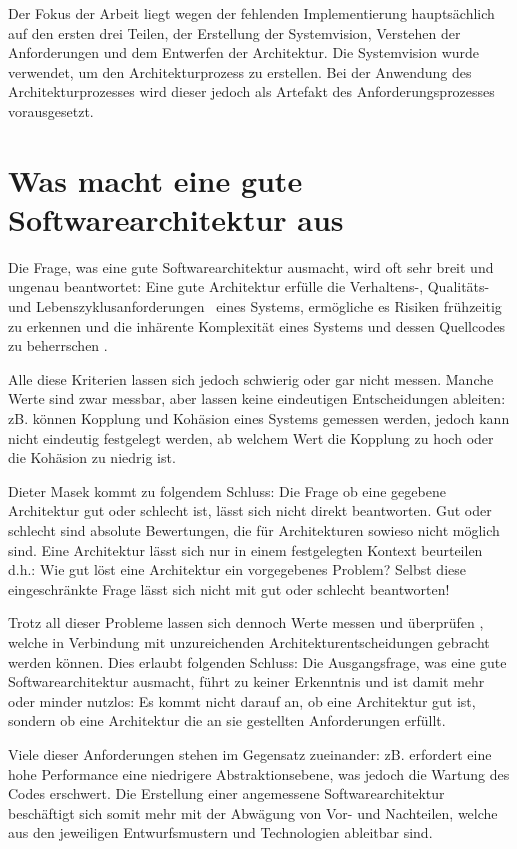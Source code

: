 Der Fokus der Arbeit liegt wegen der fehlenden Implementierung hauptsächlich auf den ersten drei Teilen, der Erstellung der Systemvision, Verstehen der Anforderungen und dem Entwerfen der Architektur. Die Systemvision wurde verwendet, um den Architekturprozess zu erstellen. Bei der Anwendung des Architekturprozesses wird dieser jedoch als Artefakt des Anforderungsprozesses vorausgesetzt.

\section{Was macht eine gute Softwarearchitektur aus}
Die Frage, was eine gute Softwarearchitektur ausmacht, wird oft sehr breit und ungenau beantwortet: Eine gute Architektur erfülle die \glqq Verhaltens-, Qualitäts- und Lebenszyklusanforderungen\grqq \ \cite[S. 12]{basiswissen} eines Systems, ermögliche es Risiken frühzeitig zu erkennen und die inhärente Komplexität eines Systems und dessen Quellcodes zu beherrschen \cite[S. 7-8]{softarch}.

Alle diese Kriterien lassen sich jedoch schwierig oder gar nicht messen. Manche Werte sind zwar messbar, aber lassen keine eindeutigen Entscheidungen ableiten: zB. können Kopplung und Kohäsion eines Systems gemessen werden, jedoch kann nicht eindeutig festgelegt werden, ab welchem Wert die Kopplung zu hoch oder die Kohäsion zu niedrig ist.

Dieter Masek kommt zu folgendem Schluss: \glqq Die Frage ob eine gegebene Architektur gut oder schlecht ist, lässt sich nicht direkt beantworten. Gut oder schlecht sind absolute Bewertungen, die für Architekturen sowieso nicht möglich sind. Eine Architektur lässt sich nur in einem festgelegten Kontext beurteilen d.h.: Wie gut löst eine Architektur ein vorgegebenes Problem? Selbst diese eingeschränkte Frage lässt sich nicht mit gut oder schlecht beantworten! \grqq \ \cite[S. 19]{review}

Trotz all dieser Probleme lassen sich dennoch Werte messen und überprüfen \cite[S. 19]{review}, welche in Verbindung mit unzureichenden Architekturentscheidungen gebracht werden können. Dies erlaubt folgenden Schluss: Die Ausgangsfrage, was eine gute Softwarearchitektur ausmacht, führt zu keiner Erkenntnis und ist damit mehr oder minder nutzlos: Es kommt nicht darauf an, ob eine Architektur gut ist, sondern ob eine Architektur die an sie gestellten Anforderungen erfüllt.

Viele dieser Anforderungen stehen im Gegensatz zueinander: zB. erfordert eine hohe Performance eine niedrigere Abstraktionsebene, was jedoch die Wartung des Codes erschwert. Die Erstellung einer angemessene Softwarearchitektur beschäftigt sich somit mehr mit der Abwägung von Vor- und Nachteilen, welche aus den jeweiligen Entwurfsmustern und Technologien ableitbar sind.

